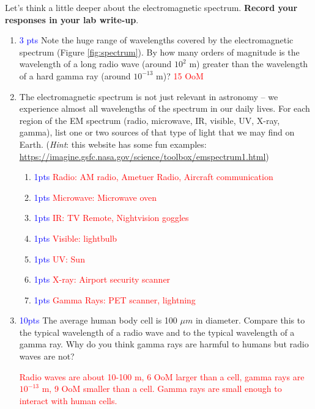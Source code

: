 \documentclass[11pt]{article}
\begin{document}
Let's think a little deeper about the electromagnetic spectrum. \textbf{Record your responses in your lab write-up}.
\begin{enumerate}
    \item \textcolor{blue}{3 pts} Note the huge range of wavelengths covered by the electromagnetic spectrum (Figure \ref{fig:spectrum}). By how many orders of magnitude is the wavelength of a long radio wave (around $10^2$ m) greater than the wavelength of a hard gamma ray (around $10^{-13}$ m)? 
    \textcolor{red}{15 OoM}
    
    \item The electromagnetic spectrum is not just relevant in astronomy -- we experience almost all wavelengths of the spectrum in our daily lives. For each region of the EM spectrum (radio, microwave, IR, visible, UV, X-ray, gamma), list one or two sources of that type of light that we may find on Earth. (\textit{Hint}: this website has some fun examples: \url{https://imagine.gsfc.nasa.gov/science/toolbox/emspectrum1.html})
    
    \begin{enumerate}
        \item \textcolor{blue}{1pts} \textcolor{red}{Radio: AM radio, Ametuer Radio, Aircraft communication}
        \item \textcolor{blue}{1pts} \textcolor{red}{Microwave: Microwave oven}
        \item \textcolor{blue}{1pts} \textcolor{red}{IR: TV Remote, Nightvision goggles}
        \item \textcolor{blue}{1pts} \textcolor{red}{Visible: lightbulb}
        \item \textcolor{blue}{1pts} \textcolor{red}{UV: Sun}
        \item \textcolor{blue}{1pts} \textcolor{red}{X-ray: Airport security scanner}
        \item \textcolor{blue}{1pts} \textcolor{red}{Gamma Rays: PET scanner, lightning}
    \end{enumerate}
    
    \item \textcolor{blue}{10pts} The average human body cell is 100 $\mu m$ in diameter. Compare this to the typical wavelength of a radio wave and to the typical wavelength of a gamma ray. Why do you think gamma rays are harmful to humans but radio waves are not?
    
    \textcolor{red}{Radio waves are about 10-100 m, 6 OoM larger than a cell, gamma rays are $10^{-13}$ m, 9 OoM smaller than a cell. Gamma rays are small enough to interact with human cells.}
    

\end{enumerate}
\end{document}

